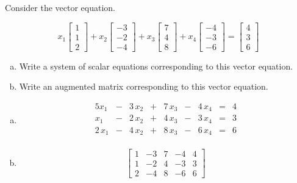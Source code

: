 
\begin{exerciseStatement}


Consider the vector equation.

\[ x_{1} \left[\begin{array}{c}
1 \\
1 \\
2
\end{array}\right] + x_{2} \left[\begin{array}{c}
-3 \\
-2 \\
-4
\end{array}\right] + x_{3} \left[\begin{array}{c}
7 \\
4 \\
8
\end{array}\right] + x_{4} \left[\begin{array}{c}
-4 \\
-3 \\
-6
\end{array}\right] = \left[\begin{array}{c}
4 \\
3 \\
6
\end{array}\right] \]
\begin{enumerate}[(a)]
\item  Write a system of scalar equations corresponding to this vector equation. 
\item  Write an augmented matrix corresponding to this vector equation. 
\end{enumerate}
    
\end{exerciseStatement}
    
\begin{exerciseAnswer} 

\begin{enumerate}[(a)]
\item 
\begin{alignat*}{5} x_{1} &-& 3 \, x_{2} &+& 7 \, x_{3} &-& 4 \, x_{4} &=& 4 \\x_{1} &-& 2 \, x_{2} &+& 4 \, x_{3} &-& 3 \, x_{4} &=& 3 \\2 \, x_{1} &-& 4 \, x_{2} &+& 8 \, x_{3} &-& 6 \, x_{4} &=& 6 \\ \end{alignat*}
            
\item \[ \left[\begin{array}{cccc|c}
1 & -3 & 7 & -4 & 4 \\
1 & -2 & 4 & -3 & 3 \\
2 & -4 & 8 & -6 & 6
\end{array}\right] \]
\end{enumerate}
    
\end{exerciseAnswer}
    
